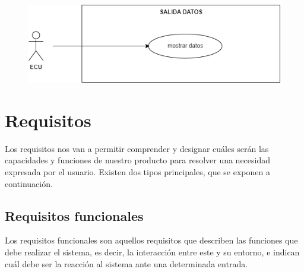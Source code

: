 \begin{figure}[H]
    \centering
    \includegraphics[width=1\textwidth]{imagenes/diagrama_CU_3.png}
\end{figure}


\section{Requisitos}

Los requisitos nos van a permitir comprender y designar cuáles serán las capacidades y funciones de nuestro producto para resolver una necesidad expresada por el usuario. Existen dos tipos principales, que se exponen a continuación.

\subsection{Requisitos funcionales}

Los requisitos funcionales son aquellos requisitos que describen las funciones que debe realizar el sistema, es decir, la interacción entre este y su entorno, e indican cuál debe ser la reacción al sistema ante una determinada entrada. 

\begin{table}[H]
    \end{table}

